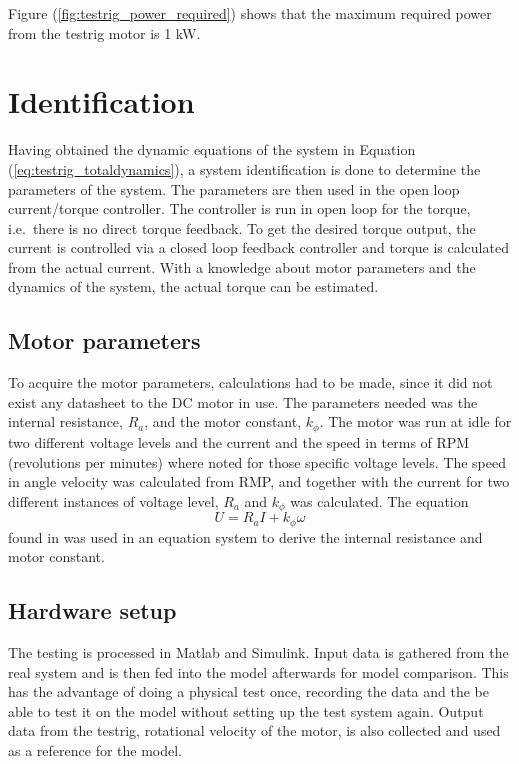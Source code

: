 Figure (\ref{fig:testrig_power_required}) shows that the maximum required power from the testrig motor is 1 kW.



\section{Identification}
Having obtained the dynamic equations of the system in Equation
(\ref{eq:testrig_totaldynamics}), a system identification is done to determine
the parameters of the system. The parameters are then used in the open loop
current/torque controller. The controller is run in open loop for the
torque, i.e.\ there is no direct torque feedback. To get the desired torque
output, the current is controlled via a closed loop feedback controller and
torque is calculated from the actual current. With a knowledge about motor
parameters and the dynamics of the system, the actual torque can be estimated. 

\subsection{Motor parameters}
To acquire the motor parameters, calculations had to be made, since it did not exist any datasheet to the DC motor in use. The parameters needed was the internal resistance, $R_{a}$, and the motor constant, $k_{\phi}$. The motor was run at idle for two different voltage levels and the current and the speed in terms of RPM (revolutions per minutes) where noted for those specific voltage levels. The speed in angle velocity was calculated from RMP, and together with the current for two different instances of voltage level, $R_{a}$ and $k_{\phi}$ was calculated. The equation
\begin{equation}
\label{eq:motor_parameters}
    U = R_a I + k_{\phi} \omega
\end{equation}
found in \cite{elektroteknik2013} was used in an equation system to derive the internal resistance and motor constant. 


\subsection{Hardware setup}
The testing is processed in Matlab and Simulink. Input data is gathered from the
real system and is then fed into the model afterwards for model comparison. This
has the advantage of doing a physical test once, recording the data and the be
able to test it on the model without setting up the test system again. Output
data from the testrig, rotational velocity of the motor, is also collected and
used as a reference for the model.

